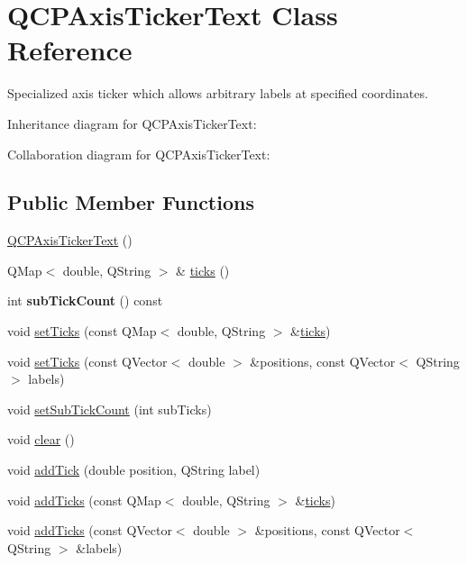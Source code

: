 \hypertarget{classQCPAxisTickerText}{}\section{Q\+C\+P\+Axis\+Ticker\+Text Class Reference}
\label{classQCPAxisTickerText}


Specialized axis ticker which allows arbitrary labels at specified coordinates.  




Inheritance diagram for Q\+C\+P\+Axis\+Ticker\+Text\+:


Collaboration diagram for Q\+C\+P\+Axis\+Ticker\+Text\+:
\subsection*{Public Member Functions}
\begin{DoxyCompactItemize}
\item 
\hyperlink{classQCPAxisTickerText_a1d7243b1256c1aa9d1d5b99b2e84e648}{Q\+C\+P\+Axis\+Ticker\+Text} ()
\item 
Q\+Map$<$ double, Q\+String $>$ \& \hyperlink{classQCPAxisTickerText_ac84622a6bb4f2a98474e185ecaf3189a}{ticks} ()
\item 
int {\bfseries sub\+Tick\+Count} () const \hypertarget{classQCPAxisTickerText_a47eabd2e4218d2cf3aee7c25e743396f}{}\label{classQCPAxisTickerText_a47eabd2e4218d2cf3aee7c25e743396f}

\item 
void \hyperlink{classQCPAxisTickerText_a8cdf1f21940f1f53f5e3d30b2c74f5cf}{set\+Ticks} (const Q\+Map$<$ double, Q\+String $>$ \&\hyperlink{classQCPAxisTickerText_ac84622a6bb4f2a98474e185ecaf3189a}{ticks})
\item 
void \hyperlink{classQCPAxisTickerText_a69f3898cc1cf11d2437851f959faa1e8}{set\+Ticks} (const Q\+Vector$<$ double $>$ \&positions, const Q\+Vector$<$ Q\+String $>$ labels)
\item 
void \hyperlink{classQCPAxisTickerText_a8cfa50c51183c90186892eeef978d571}{set\+Sub\+Tick\+Count} (int sub\+Ticks)
\item 
void \hyperlink{classQCPAxisTickerText_a21826d2fcd9a25c194d34d4f67aa1460}{clear} ()
\item 
void \hyperlink{classQCPAxisTickerText_aada3db69e5fc6585aaa4ea5d89552eb0}{add\+Tick} (double position, Q\+String label)
\item 
void \hyperlink{classQCPAxisTickerText_aba34051300eecaefbedb2df8feff2d45}{add\+Ticks} (const Q\+Map$<$ double, Q\+String $>$ \&\hyperlink{classQCPAxisTickerText_ac84622a6bb4f2a98474e185ecaf3189a}{ticks})
\item 
void \hyperlink{classQCPAxisTickerText_a8140c730e20b0050e1b702af3db00b2e}{add\+Ticks} (const Q\+Vector$<$ double $>$ \&positions, const Q\+Vector$<$ Q\+String $>$ \&labels)
\end{DoxyCompactItemize}
